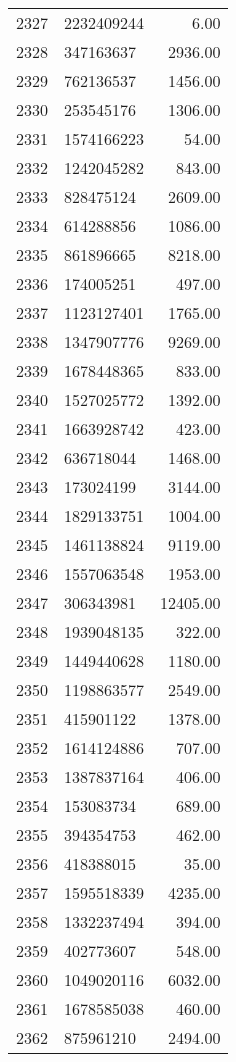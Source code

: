 \begin{table}[ht]
\begin{tabular}{rlr}
  2327 & 2232409244 & 6.00 \\ 
  2328 & 347163637 & 2936.00 \\ 
  2329 & 762136537 & 1456.00 \\ 
  2330 & 253545176 & 1306.00 \\ 
  2331 & 1574166223 & 54.00 \\ 
  2332 & 1242045282 & 843.00 \\ 
  2333 & 828475124 & 2609.00 \\ 
  2334 & 614288856 & 1086.00 \\ 
  2335 & 861896665 & 8218.00 \\ 
  2336 & 174005251 & 497.00 \\ 
  2337 & 1123127401 & 1765.00 \\ 
  2338 & 1347907776 & 9269.00 \\ 
  2339 & 1678448365 & 833.00 \\ 
  2340 & 1527025772 & 1392.00 \\ 
  2341 & 1663928742 & 423.00 \\ 
  2342 & 636718044 & 1468.00 \\ 
  2343 & 173024199 & 3144.00 \\ 
  2344 & 1829133751 & 1004.00 \\ 
  2345 & 1461138824 & 9119.00 \\ 
  2346 & 1557063548 & 1953.00 \\ 
  2347 & 306343981 & 12405.00 \\ 
  2348 & 1939048135 & 322.00 \\ 
  2349 & 1449440628 & 1180.00 \\ 
  2350 & 1198863577 & 2549.00 \\ 
  2351 & 415901122 & 1378.00 \\ 
  2352 & 1614124886 & 707.00 \\ 
  2353 & 1387837164 & 406.00 \\ 
  2354 & 153083734 & 689.00 \\ 
  2355 & 394354753 & 462.00 \\ 
  2356 & 418388015 & 35.00 \\ 
  2357 & 1595518339 & 4235.00 \\ 
  2358 & 1332237494 & 394.00 \\ 
  2359 & 402773607 & 548.00 \\ 
  2360 & 1049020116 & 6032.00 \\ 
  2361 & 1678585038 & 460.00 \\ 
  2362 & 875961210 & 2494.00 \\ 

\end{tabular}
\end{table}

